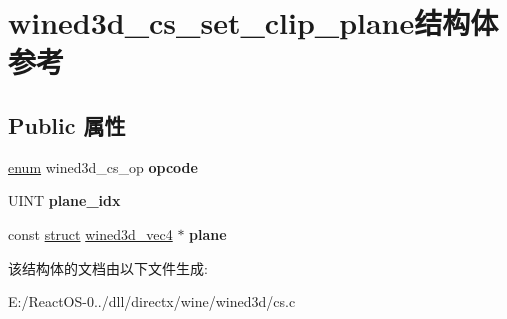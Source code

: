\hypertarget{structwined3d__cs__set__clip__plane}{}\section{wined3d\+\_\+cs\+\_\+set\+\_\+clip\+\_\+plane结构体 参考}
\label{structwined3d__cs__set__clip__plane}
\subsection*{Public 属性}
\begin{DoxyCompactItemize}
\item 
\mbox{\label{structwined3d__cs__set__clip__plane_a3886a52a68b25ef0b59b91461e76f131}} 
\hyperlink{interfaceenum}{enum} wined3d\+\_\+cs\+\_\+op {\bfseries opcode}
\item 
\mbox{\label{structwined3d__cs__set__clip__plane_afe9301284435a8a44a11c773aedf6c0b}} 
U\+I\+NT {\bfseries plane\+\_\+idx}
\item 
\mbox{\label{structwined3d__cs__set__clip__plane_a5316f559ffca7c04d3691981838cfd5b}} 
const \hyperlink{interfacestruct}{struct} \hyperlink{structwined3d__vec4}{wined3d\+\_\+vec4} $\ast$ {\bfseries plane}
\end{DoxyCompactItemize}


该结构体的文档由以下文件生成\+:\begin{DoxyCompactItemize}
\item 
E\+:/\+React\+O\+S-\/0../dll/directx/wine/wined3d/cs.\+c\end{DoxyCompactItemize}
